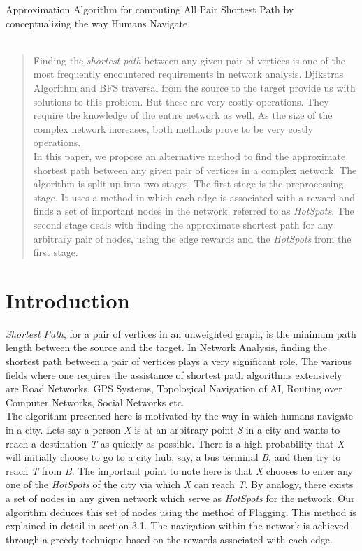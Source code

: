 \documentclass{article}
\begin{document}
\begin{center}
\Huge{Approximation Algorithm for computing All Pair Shortest Path by conceptualizing the way Humans Navigate} \\\
\end{center}

\begin{abstract}
Finding the \textit{shortest path} between any given pair of vertices is one of the most frequently encountered requirements in network analysis. Djikstras Algorithm and BFS traversal from the source to the target provide us with solutions to this problem. But these are very costly operations. They require the knowledge of the entire network as well. As the size of the complex network increases, both methods prove to be very costly operations.\\

In this paper, we propose an alternative method to find the approximate shortest path between any given pair of vertices in a complex network. The algorithm is split up into two stages. The first stage is the preprocessing stage. It uses a method in which each edge is associated with a reward and finds a set of important nodes in the network, referred to as \textit{HotSpots}. The second stage deals with finding the approximate shortest path for any arbitrary pair of nodes, using the edge rewards and the \textit{HotSpots} from the first stage.
\end{abstract}

\section{Introduction}
\textit{Shortest Path}, for a pair of vertices in an unweighted graph, is the minimum path length between the source and the target. In Network Analysis, finding the shortest path between a pair of vertices plays a very significant role. The various fields where one requires the assistance of shortest path algorithms extensively are Road Networks, GPS Systems, Topological Navigation of AI, Routing over Computer Networks, Social Networks etc.\\

The algorithm presented here is motivated by the way in which humans navigate in a city. Lets say a person \textit{X} is at an arbitrary point \textit{S} in a city and wants to reach a destination \textit{T} as quickly as possible. There is a high probability that \textit{X} will initially choose to go to a city hub, say, a bus terminal \textit{B}, and then try to reach \textit{T} from \textit{B}. The important point to note here is that \textit{X} chooses to enter any one of the \textit{HotSpots} of the city via which \textit{X} can reach \textit{T}. By analogy, there exists a set of nodes in any given network which serve as \textit{HotSpots} for the network. Our algorithm deduces this set of nodes using the method of Flagging. This method is explained in detail in section 3.1. The navigation within the network is achieved through a greedy technique based on the rewards associated with each edge.\\
\end{document}
